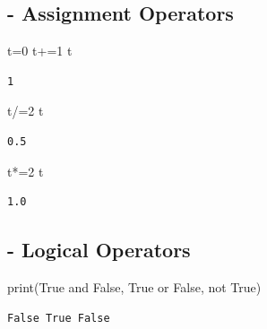 \documentclass[
  letterpaper,
  DIV=11,
  numbers=noendperiod]{scrreprt}
\newenvironment{Shaded}{\begin{snugshade}}{\end{snugshade}}
\newcommand{\BuiltInTok}[1]{\textcolor[rgb]{0.00,0.23,0.31}{#1}}
\newcommand{\DecValTok}[1]{\textcolor[rgb]{0.68,0.00,0.00}{#1}}
\newcommand{\KeywordTok}[1]{\textcolor[rgb]{0.00,0.23,0.31}{#1}}
\newcommand{\NormalTok}[1]{\textcolor[rgb]{0.00,0.23,0.31}{#1}}
\newcommand{\OperatorTok}[1]{\textcolor[rgb]{0.37,0.37,0.37}{#1}}
\newcommand{\VariableTok}[1]{\textcolor[rgb]{0.07,0.07,0.07}{#1}}
\begin{document}
\subsection{- Assignment Operators}\label{assignment-operators}

\begin{Shaded}
\begin{Highlighting}[]
\NormalTok{t}\OperatorTok{=}\DecValTok{0}
\NormalTok{t}\OperatorTok{+=}\DecValTok{1}
\NormalTok{t}
\end{Highlighting}
\end{Shaded}

\begin{verbatim}
1
\end{verbatim}

\begin{Shaded}
\begin{Highlighting}[]
\NormalTok{t}\OperatorTok{/=}\DecValTok{2}
\NormalTok{t}
\end{Highlighting}
\end{Shaded}

\begin{verbatim}
0.5
\end{verbatim}

\begin{Shaded}
\begin{Highlighting}[]
\NormalTok{t}\OperatorTok{*=}\DecValTok{2}
\NormalTok{t}
\end{Highlighting}
\end{Shaded}

\begin{verbatim}
1.0
\end{verbatim}

\subsection{- Logical Operators}\label{logical-operators}

\begin{Shaded}
\begin{Highlighting}[]
\BuiltInTok{print}\NormalTok{(}\VariableTok{True} \KeywordTok{and} \VariableTok{False}\NormalTok{, }\VariableTok{True} \KeywordTok{or} \VariableTok{False}\NormalTok{, }\KeywordTok{not} \VariableTok{True}\NormalTok{)}
\end{Highlighting}
\end{Shaded}

\begin{verbatim}
False True False
\end{verbatim}
\end{document}
